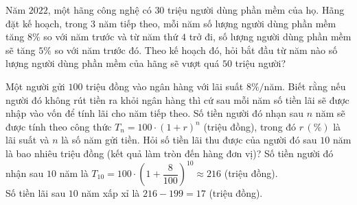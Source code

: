\begin{ex}%
	Năm $2022$, một hãng công nghệ có $30$ triệu người dùng phần mềm của họ. Hãng đặt kế hoạch, trong $3$ năm tiếp theo, mỗi năm số lượng người dùng phần mềm tăng $8\%$ so với năm trước và từ năm thứ $4$ trở đi, số lượng người dùng phần mềm sẽ tăng $5\%$ so với năm trước đó. Theo kế hoạch đó, hỏi bắt đầu từ năm nào số lượng người dùng phần mềm của hãng sẽ vượt quá $50$ triệu người?
\end{ex}

\begin{ex}%
	Một người gửi $100$ triệu đồng vào ngân hàng với lãi suất $8\%/$năm. Biết rằng nếu người đó không rút tiền ra khỏi ngân hàng thì cứ sau mỗi năm số tiền lãi sẽ được nhập vào vốn để tính lãi cho năm tiếp theo. Số tiền người đó nhạn sau $n$ năm sẽ được tính theo công thức $T_n=100\cdot (1+r)^{n}$ (triệu đồng), trong đó $r\,(\%)$ là lãi suất và $n$ là số năm gửi tiền.
	Hỏi số tiền lãi thu được của người đó sau $10$ năm là bao nhiêu triệu đồng (kết quả làm tròn đến hàng đơn vị)?
	\loigiai
	{
		Số tiền người đó nhận sau $10$ năm là $T_{10}=100\cdot\left (1+\dfrac{8}{100} \right )^{10}\approx 216$ (triệu đồng).\\
		Số tiền lãi sau $10$ năm xấp xỉ là $216-199=17$ (triệu đồng).
	} 
\end{ex}

